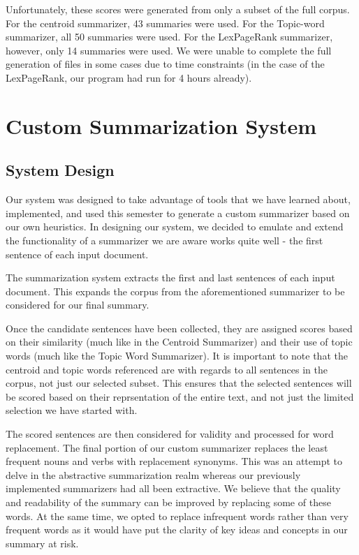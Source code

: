 \documentclass[11pt,letterpaper]{article}
\begin{document}
Unfortunately, these scores were generated from only a subset of the full corpus. For the centroid summarizer, 43 summaries were used. For the Topic-word summarizer, all 50 summaries were used. For the LexPageRank summarizer, however, only 14 summaries were used. We were unable to complete the full generation of files in some cases due to time constraints (in the case of the LexPageRank, our program had run for 4 hours already).

\section{Custom Summarization System}
\subsection{System Design}
Our system was designed to take advantage of tools that we have learned about, implemented, and used this semester to generate a custom summarizer based on our own heuristics. In designing our system, we decided to emulate and extend the functionality of a summarizer we are aware works quite well - the first sentence of each input document.

The summarization system extracts the first and last sentences of each input document. This expands the corpus from the aforementioned summarizer to be considered for our final summary.

Once the candidate sentences have been collected, they are assigned scores based on their similarity (much like in the Centroid Summarizer) and their use of topic words (much like the Topic Word Summarizer). It is important to note that the centroid and topic words referenced are with regards to all sentences in the corpus, not just our selected subset. This ensures that the selected sentences will be scored based on their reprsentation of the entire text, and not just the limited selection we have started with.

The scored sentences are then considered for validity and processed for word replacement. The final portion of our custom summarizer replaces the least frequent nouns and verbs with replacement synonyms. This was an attempt to delve in the abstractive summarization realm whereas our previously implemented summarizers had all been extractive. We believe that the quality and readability of the summary can be improved by replacing some of these words. At the same time, we opted to replace infrequent words rather than very frequent words as it would have put the clarity of key ideas and concepts in our summary at risk.
\end{document}
